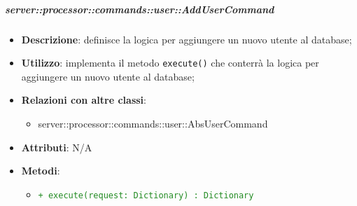         \subparagraph{server::processor::commands::user::AddUserCommand} %
        \label{subp:bdsm_app_server_processor_commands_user_addusercommand}
        \begin{itemize}
          \item \textbf{Descrizione}: definisce la logica per aggiungere un nuovo utente al database;
          \item \textbf{Utilizzo}: implementa il metodo \texttt{execute()} che conterrà la logica per aggiungere un nuovo utente al database;
          \item \textbf{Relazioni con altre classi}:
            \begin{itemize}
              \item server::processor::commands::user::AbsUserCommand
            \end{itemize}
          \item \textbf{Attributi}: N/A
          \item \textbf{Metodi}:
          \begin{itemize}
              \item \textcolor{forestgreen}{\texttt{+ execute(request: Dictionary) : Dictionary}}
          \end{itemize}
        \end{itemize}

